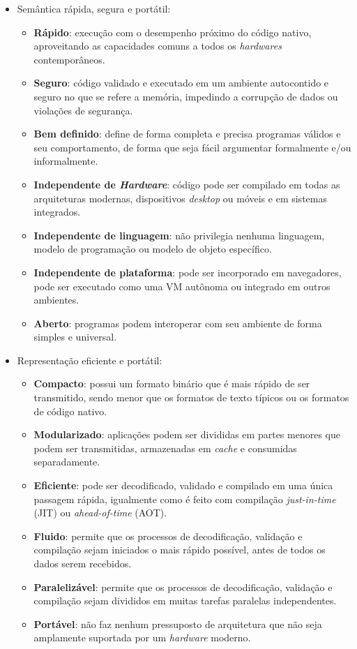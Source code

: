 \begin{itemize}
    \item Semântica rápida, segura e portátil:
    \begin{itemize}
        \item \textbf{Rápido}: execução com o desempenho próximo do código nativo,
        aproveitando as capacidades comuns a todos os \textit{hardwares} contemporâneos.
        \item \textbf{Seguro}: código validado e executado em um ambiente autocontido e
        seguro no que se refere a memória, impedindo a corrupção de dados ou violações de
        segurança.
        \item \textbf{Bem definido}: define de forma completa e precisa programas válidos
        e seu comportamento, de forma que seja fácil argumentar formalmente e/ou
        informalmente.
        \item \textbf{Independente de \textit{Hardware}}: código pode ser compilado em
        todas as arquiteturas modernas, dispositivos \textit{desktop} ou móveis e em
        sistemas integrados.
        \item \textbf{Independente de linguagem}: não privilegia nenhuma linguagem,
        modelo de programação ou modelo de objeto específico.
        \item \textbf{Independente de plataforma}: pode ser incorporado em navegadores,
        pode ser executado como uma VM autônoma ou integrado em outros ambientes.
        \item \textbf{Aberto}: programas podem interoperar com seu ambiente de forma
        simples e universal.
    \end{itemize}
    \item Representação eficiente e portátil:
    \begin{itemize}
        \item \textbf{Compacto}: possui um formato binário que é mais rápido de ser
        transmitido, sendo menor que os formatos de texto típicos ou os formatos de
        código nativo.
        \item \textbf{Modularizado}: aplicações podem ser divididas em partes menores que
        podem ser transmitidas, armazenadas em \textit{cache} e consumidas separadamente.
        \item \textbf{Eficiente}: pode ser decodificado, validado e compilado em uma única
        passagem rápida, igualmente como é feito com compilação \textit{just-in-time}
        (JIT) ou \textit{ahead-of-time} (AOT).
        \item \textbf{Fluido}: permite que os processos de decodificação, validação e
        compilação sejam iniciados o mais rápido possível, antes de todos os dados serem
        recebidos.
        \item \textbf{Paralelizável}: permite que os processos de decodificação, validação
        e compilação sejam divididos em muitas tarefas paralelas independentes.
        \item \textbf{Portável}: não faz nenhum pressuposto de arquitetura que não seja
        amplamente suportada por um \textit{hardware} moderno.
    \end{itemize}
\end{itemize}

